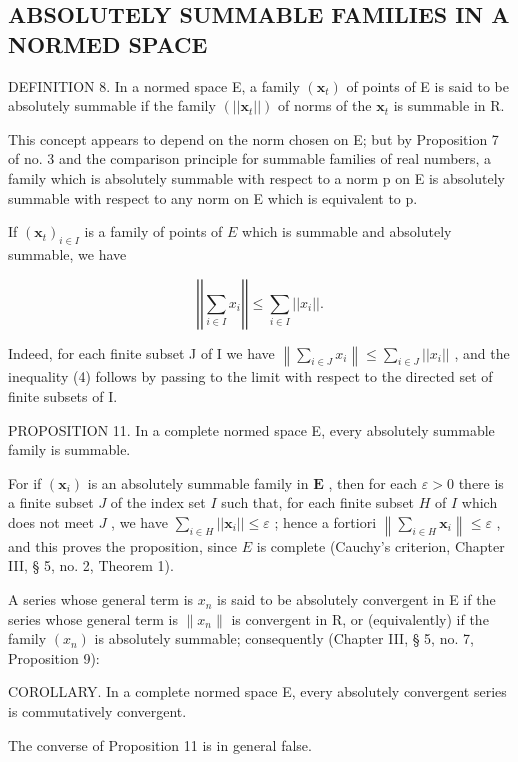 \subsection{ABSOLUTELY SUMMABLE FAMILIES IN A NORMED SPACE}

DEFINITION 8. In a normed space E, a family \((\pmb{x}_{t})\) of points of E is said to be absolutely summable if the family \((||\pmb{x}_{t}||)\) of norms of the \(\pmb{x}_{t}\) is summable in R.

This concept appears to depend on the norm chosen on E; but by Proposition 7 of no. 3 and the comparison principle for summable families of real numbers, a family which is absolutely summable with respect to a norm p on E is absolutely summable with respect to any norm on E which is equivalent to p.

If \((\pmb{x}_t)_{i\in I}\) is a family of points of \(E\) which is summable and absolutely summable, we have

\[
\left| \left| \sum_ {i \in I} x _ {i} \right| \right| \leqslant \sum_ {i \in I} | | x _ {i} | |.\tag{4}
\]

Indeed, for each finite subset J of I we have \(\left\|\sum_{i\in J}x_{i}\right\| \leqslant \sum_{i\in J}||x_{i}||\) , and the inequality (4) follows by passing to the limit with respect to the directed set of finite subsets of I.

PROPOSITION 11. In a complete normed space E, every absolutely summable family is summable.

For if \((\pmb{x}_i)\) is an absolutely summable family in \(\mathbf{E}\) , then for each \(\varepsilon > 0\) there is a finite subset \(J\) of the index set \(I\) such that, for each finite subset \(H\) of \(I\) which does not meet \(J\) , we have \(\sum_{i \in H} ||\pmb{x}_i|| \leqslant \varepsilon\) ; hence a fortiori \(\left\| \sum_{i \in H} \pmb{x}_i \right\| \leqslant \varepsilon\) , and this proves the proposition, since \(E\) is complete (Cauchy's criterion, Chapter III, § 5, no. 2, Theorem 1).

A series whose general term is \(x_{n}\) is said to be absolutely convergent in E if the series whose general term is \(\|x_{n}\|\) is convergent in R, or (equivalently) if the family \((x_{n})\) is absolutely summable; consequently (Chapter III, § 5, no. 7, Proposition 9):

COROLLARY. In a complete normed space E, every absolutely convergent series is commutatively convergent.

The converse of Proposition 11 is in general false.

